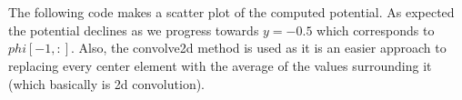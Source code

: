\documentclass[a4paper, 11pt, margin= 1.25cm]{article}
\begin{document}
    \begin{center}
    \end{center}
    { \hspace*{\fill} \\}
    
    \begin{center}
    \end{center}
    { \hspace*{\fill} \\}
    
    The following code makes a scatter plot of the computed potential. As
expected the potential declines as we progress towards $y = -0.5$ which
corresponds to $phi[-1,:]$. Also, the convolve2d method is used as it is
an easier approach to replacing every center element with the average of
the values surrounding it (which basically is 2d convolution).
\end{document}
